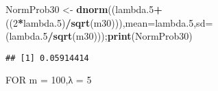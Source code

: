 \documentclass[
]{article}
\newenvironment{Shaded}{\begin{snugshade}}{\end{snugshade}}
\newcommand{\DataTypeTok}[1]{\textcolor[rgb]{0.13,0.29,0.53}{#1}}
\newcommand{\DecValTok}[1]{\textcolor[rgb]{0.00,0.00,0.81}{#1}}
\newcommand{\FloatTok}[1]{\textcolor[rgb]{0.00,0.00,0.81}{#1}}
\newcommand{\KeywordTok}[1]{\textcolor[rgb]{0.13,0.29,0.53}{\textbf{#1}}}
\newcommand{\NormalTok}[1]{#1}
\newcommand{\OperatorTok}[1]{\textcolor[rgb]{0.81,0.36,0.00}{\textbf{#1}}}
\newcommand{\StringTok}[1]{\textcolor[rgb]{0.31,0.60,0.02}{#1}}
\begin{document}
\begin{Shaded}
\begin{Highlighting}[]
\NormalTok{NormProb30 <-}\StringTok{ }\KeywordTok{dnorm}\NormalTok{((lambda}\FloatTok{.5}\OperatorTok{+}\NormalTok{((}\DecValTok{2}\OperatorTok{*}\NormalTok{lambda}\FloatTok{.5}\NormalTok{)}\OperatorTok{/}\KeywordTok{sqrt}\NormalTok{(m30))),}\DataTypeTok{mean=}\NormalTok{lambda}\FloatTok{.5}\NormalTok{,}\DataTypeTok{sd=}\NormalTok{(lambda}\FloatTok{.5}\OperatorTok{/}\KeywordTok{sqrt}\NormalTok{(m30)));}\KeywordTok{print}\NormalTok{(NormProb30)}
\end{Highlighting}
\end{Shaded}

\begin{verbatim}
## [1] 0.05914414
\end{verbatim}

FOR m = 100,λ = 5
\end{document}
